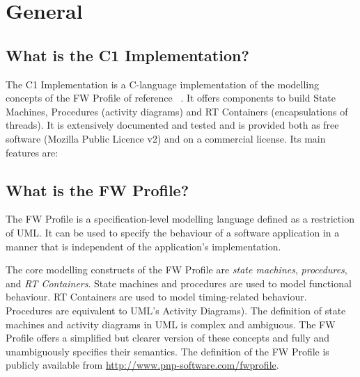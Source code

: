 \documentclass[faq]{../fwprofile}
\begin{document}
\fwmaketitle
\begin{abstract}
This document is the FAQ for the C1 Implementation of the FW Profile. The FW Profile is a specification-level modelling language defined as a restriction of UML. The core modelling constructs offered by the FW Profile are State Machines, Procedures (equivalent to UML's Activity Diagrams), and RT Containers (encapsulations of threads).
\par
The FW Profile is implementation-independent. The C1 Implementation is a C language implementation of the modelling concepts of the FW Profile. The main features of the C1 Implementation are: small memory footprint, small CPU demands, scalability, and
high reliability. 
\par
The C1 Implementation is provided with a Qualification Data Package which can be used to support the certification of applications built using its components.
\end{abstract}
\fwfrontmatter


\section{General}
\subsection{What is the C1 Implementation?}
The C1 Implementation is a C-language implementation of the modelling concepts of the FW Profile of reference ~\cite{ref:fwprofile}. It offers components to build State Machines, Procedures (activity diagrams) and RT Containers (encapsulations of threads). It is extensively documented and tested and is provided both as free software (Mozilla Public Licence v2) and on a commercial license. Its main features are:



\subsection{What is the FW Profile?}\label{faq:FW_Profile}
The FW Profile is a specification-level modelling language defined as a restriction of UML. It can be used to specify the behaviour of a software application in a manner that is independent of the application's implementation.

The core modelling constructs of the FW Profile are \emph{state machines},  \emph{procedures}, and \emph{RT Containers}. State machines and procedures are used to model functional behaviour. RT Containers are used to model timing-related behaviour. Procedures are equivalent to UML's Activity Diagrams). The definition of state machines and activity diagrams in UML is complex and ambiguous. The FW Profile offers a simplified but clearer version of these concepts and fully and 
unambiguously specifies their semantics. The definition of the FW Profile is publicly available from \url{http://www.pnp-software.com/fwprofile}.
\end{document}
